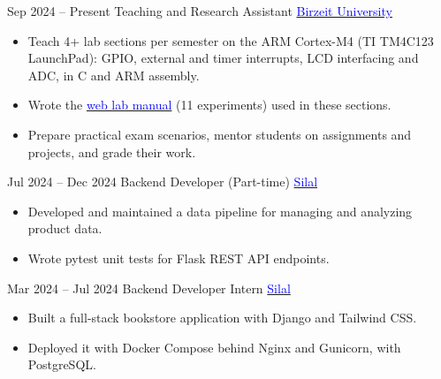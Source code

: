 \documentclass[9pt]{developercv} %
\begin{document}
\begin{entrylist}

    \entry
    {Sep 2024 -- Present}
    {Teaching and Research Assistant}
    {\href{https://www.birzeit.edu/en}{\textcolor{blue}{Birzeit University}}}
    {\vspace{-10pt}
    \begin{itemize}[noitemsep,topsep=0pt,parsep=0pt,partopsep=0pt,leftmargin=*]
        \item Teach 4+ lab sections per semester on the ARM Cortex-M4 (TI TM4C123 LaunchPad): GPIO, external and timer interrupts, LCD interfacing and ADC, in C and ARM assembly.
        \item Wrote the \href{https://encs4110.birzeit.me}{\textcolor{blue}{web lab manual}} (11 experiments) used in these sections.
        \item Prepare practical exam scenarios, mentor students on assignments and projects, and grade their work.
    \end{itemize}\vspace{-4pt}}
    \entry
        {Jul 2024 -- Dec 2024}
        {Backend Developer (Part-time)}
        {{\href{https://www.silal.app/en}{\textcolor{blue}{Silal}}}}
        {\vspace{-10pt}
        \begin{itemize}[noitemsep,topsep=0pt,parsep=0pt,partopsep=0pt,leftmargin=*]
            \item Developed and maintained a data pipeline for managing and analyzing product data.
            \item Wrote pytest unit tests for Flask REST API endpoints.
        \end{itemize}\vspace{-4pt}}
    \entry
        {Mar 2024 -- Jul 2024}
        {Backend Developer Intern}
        {{\href{https://www.silal.app/en}{\textcolor{blue}{Silal}}}}
        {\vspace{-10pt}
        \begin{itemize}[noitemsep,topsep=0pt,parsep=0pt,partopsep=0pt,leftmargin=*]
            \item Built a full-stack bookstore application with Django and Tailwind CSS.
            \item Deployed it with Docker Compose behind Nginx and Gunicorn, with PostgreSQL.
        \end{itemize}\vspace{-4pt}}
\end{entrylist}
\end{document}
